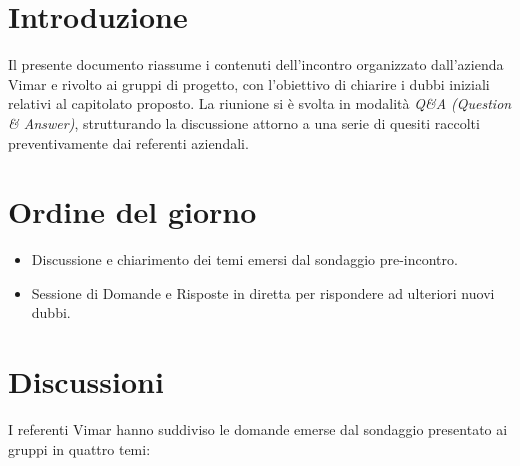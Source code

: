 \documentclass[11pt, a4paper]{article}
\begin{document}
\section{Introduzione}
Il presente documento riassume i contenuti dell'incontro organizzato dall'azienda Vimar e rivolto ai gruppi di progetto, con l'obiettivo di chiarire i dubbi iniziali relativi al capitolato proposto. La riunione si è svolta in modalità \textit{Q\&A (Question \& Answer)}, strutturando la discussione attorno a una serie di quesiti raccolti preventivamente dai referenti aziendali.

\section{Ordine del giorno}
\begin{itemize}
    \item Discussione e chiarimento dei temi emersi dal sondaggio pre-incontro.
    \item Sessione di Domande e Risposte in diretta per rispondere ad ulteriori nuovi dubbi.
\end{itemize}

\section{Discussioni}
I referenti Vimar hanno suddiviso le domande emerse dal sondaggio presentato ai gruppi in quattro temi: 
\end{document}
